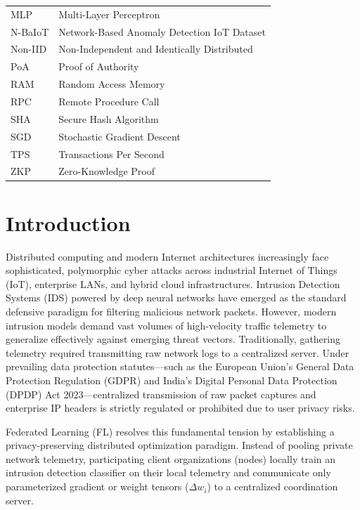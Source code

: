 \documentclass[12pt,a4paper]{report}
\begin{document}
\begin{table}[H]
\begin{tabularx}{\textwidth}{lX}
MLP & Multi-Layer Perceptron \\
N-BaIoT & Network-Based Anomaly Detection IoT Dataset \\
Non-IID & Non-Independent and Identically Distributed \\
PoA & Proof of Authority \\
RAM & Random Access Memory \\
RPC & Remote Procedure Call \\
SHA & Secure Hash Algorithm \\
SGD & Stochastic Gradient Descent \\
TPS & Transactions Per Second \\
ZKP & Zero-Knowledge Proof \\
\bottomrule
\end{tabularx}
\end{table}

\newpage
{}
\setcounter{page}{1}

\chapter{Introduction}

Distributed computing and modern Internet architectures increasingly face sophisticated, polymorphic cyber attacks across industrial Internet of Things (IoT), enterprise LANs, and hybrid cloud infrastructures. Intrusion Detection Systems (IDS) powered by deep neural networks have emerged as the standard defensive paradigm for filtering malicious network packets. However, modern intrusion models demand vast volumes of high-velocity traffic telemetry to generalize effectively against emerging threat vectors. Traditionally, gathering telemetry required transmitting raw network logs to a centralized server. Under prevailing data protection statutes---such as the European Union's General Data Protection Regulation (GDPR) and India's Digital Personal Data Protection (DPDP) Act 2023---centralized transmission of raw packet captures and enterprise IP headers is strictly regulated or prohibited due to user privacy risks.

Federated Learning (FL) resolves this fundamental tension by establishing a privacy-preserving distributed optimization paradigm. Instead of pooling private network telemetry, participating client organizations (nodes) locally train an intrusion detection classifier on their local telemetry and communicate only parameterized gradient or weight tensors ($\Delta w_i$) to a centralized coordination server. 
\end{document}
